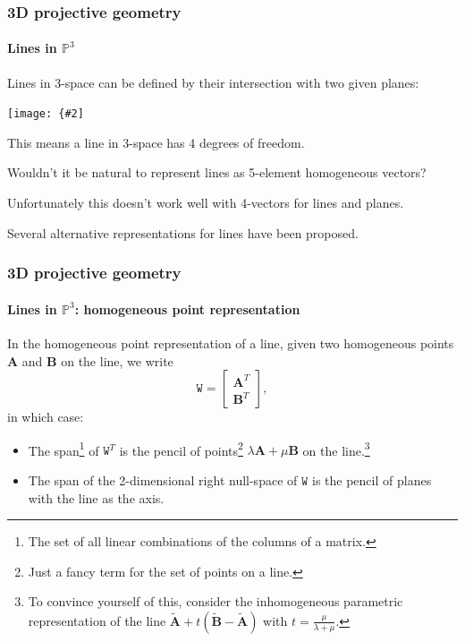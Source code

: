 \documentclass[aspectratio=169]{beamer}
\renewcommand{\vec}[1]{\boldsymbol{#1}}
\newcommand{\mat}[1]{\mathtt{#1}}
\def\Pset{\mathbb{P}}
\newcommand{\myfig}[3]{\centerline{\texttt{[image: \{\#2]}}}
\begin{document}
\begin{frame}
\frametitle{3D projective geometry}
\framesubtitle{Lines in $\Pset^3$}

Lines in 3-space can be defined by their \alert{intersection with two
given planes}:

\myfig{2.0in}{HZ-fig2-1}{Hartley and Zisserman (2004) Fig.\ 3.1}

\medskip

This means a line in 3-space has \alert{4 degrees of freedom}.

\medskip

Wouldn't it be natural to represent lines as 5-element homogeneous
vectors?

\medskip

Unfortunately this doesn't work well with 4-vectors for lines and
planes.

\medskip

Several alternative representations for lines have been proposed.

\end{frame}

\begin{frame}
\frametitle{3D projective geometry}
\framesubtitle{Lines in $\Pset^3$: homogeneous point representation}

In the \alert{homogeneous point representation} of a line, given two
homogeneous points $\vec{A}$ and $\vec{B}$ on the line, we write
\begin{equation*}
\mat{W} = \begin{bmatrix} \vec{A}^T \\ \vec{B}^T \end{bmatrix},
\end{equation*}
in which case:
\begin{itemize}
\item The \alert{span}\footnote{The set of all linear combinations of
    the columns of a matrix.} of $\mat{W}^T$ is the \alert{pencil of
    points}\footnote{Just a fancy term for the set of points on a
    line.}  $\lambda \vec{A} + \mu \vec{B}$ on the line.\footnote{To
    convince yourself of this, consider the inhomogeneous parametric
    representation of the line
    $\tilde{\vec{A}}+t(\tilde{\vec{B}}-\tilde{\vec{A}})$ with
    $t=\frac{\mu}{\lambda+\mu}$.}
\item The span of the 2-dimensional right \alert{null-space} of
  $\mat{W}$ is the \alert{pencil of planes} with the line as the axis.
\end{itemize}

\end{frame}
\end{document}
